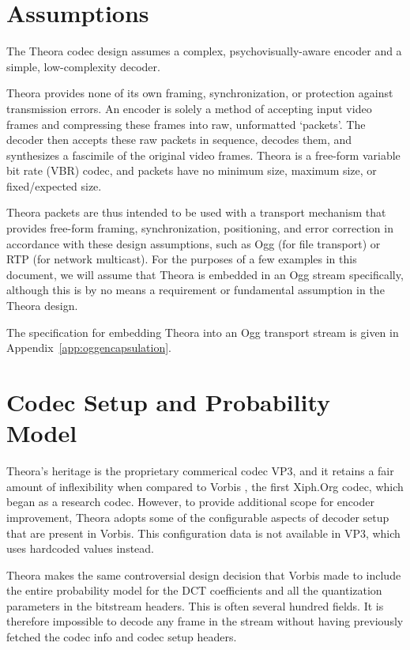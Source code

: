 \documentclass[9pt,letterpaper]{book}
\numberwithin{equation}{chapter}
\numberwithin{figure}{chapter}
\numberwithin{table}{chapter}
\begin{document}
\section{Assumptions}

The Theora codec design assumes a complex, psychovisually-aware encoder and a
 simple, low-complexity decoder.

Theora provides none of its own framing, synchronization, or protection against
 transmission errors. 
An encoder is solely a method of accepting input video frames and
 compressing these frames into raw, unformatted `packets'.
The decoder then accepts these raw packets in sequence, decodes them, and
 synthesizes a fascimile of the original video frames.
Theora is a free-form variable bit rate (VBR) codec, and packets have no
 minimum size, maximum size, or fixed/expected size.

Theora packets are thus intended to be used with a transport mechanism that
 provides free-form framing, synchronization, positioning, and error correction
 in accordance with these design assumptions, such as Ogg (for file transport)
 or RTP (for network multicast).
For the purposes of a few examples in this document, we will assume that Theora
 is embedded in an Ogg stream specifically, although this is by no means a
 requirement or fundamental assumption in the Theora design.

The specification for embedding Theora into an Ogg transport stream is given in
 Appendix~\ref{app:oggencapsulation}.

\section{Codec Setup and Probability Model}

Theora's heritage is the proprietary commerical codec VP3, and it retains a
 fair amount of inflexibility when compared to Vorbis \cite{vorbis}, the first
 Xiph.Org codec, which began as a research codec.
However, to provide additional scope for encoder improvement, Theora adopts
 some of the configurable aspects of decoder setup that are present in Vorbis.
This configuration data is not available in VP3, which uses hardcoded values
 instead.

Theora makes the same controversial design decision that Vorbis made to include
 the entire probability model for the DCT coefficients and all the quantization
 parameters in the bitstream headers.
This is often several hundred fields.
It is therefore impossible to decode any frame in the stream without
 having previously fetched the codec info and codec setup headers.
\end{document}
